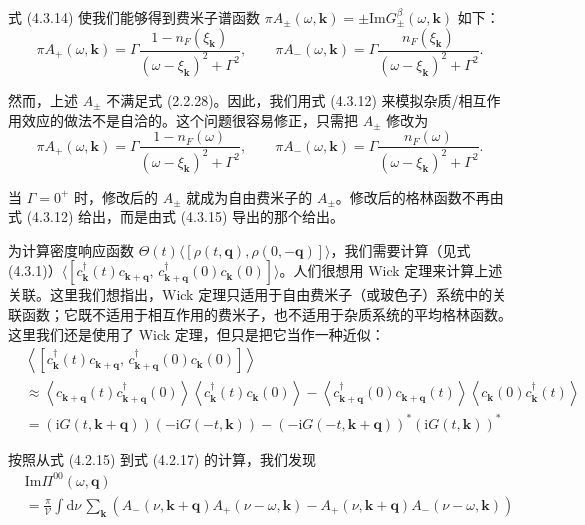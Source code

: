 式 (4.3.14) 使我们能够得到费米子谱函数 $\pi A_{\pm}(\omega,\pmb{k})=\pm\mathrm{Im}G^{\beta}_{\pm}(\omega,\pmb{k})$ 如下：
\begin{equation*}
\pi A_+(\omega,\pmb{k}) = \Gamma\frac{1-n_F(\xi_{\pmb{k}})}{(\omega-\xi_{\pmb{k}})^2+\Gamma^2}, \qquad \pi A_-(\omega,\pmb{k}) = \Gamma\frac{n_F(\xi_{\pmb{k}})}{(\omega-\xi_{\pmb{k}})^2+\Gamma^2}.
\end{equation*}

然而，上述 $A_{\pm}$ 不满足式 (2.2.28)。因此，我们用式 (4.3.12) 来模拟杂质/相互作用效应的做法不是自洽的。这个问题很容易修正，只需把 $A_{\pm}$ 修改为
\begin{equation*}
\pi A_+(\omega,\pmb{k}) = \Gamma\frac{1-n_F(\omega)}{(\omega-\xi_{\pmb{k}})^2+\Gamma^2}, \qquad \pi A_-(\omega,\pmb{k}) = \Gamma\frac{n_F(\omega)}{(\omega-\xi_{\pmb{k}})^2+\Gamma^2}. \tag{4.3.15}
\end{equation*}

当 $\Gamma=0^{+}$ 时，修改后的 $A_{\pm}$ 就成为自由费米子的 $A_{\pm}$。修改后的格林函数不再由式 (4.3.12) 给出，而是由式 (4.3.15) 导出的那个给出。

为计算密度响应函数 $\Theta(t)\langle[\rho(t,\pmb{q}),\allowbreak\rho(0,-\pmb{q})]\rangle$，我们需要计算（见式 (4.3.1)）$\langle[c^{\dagger}_{\pmb{k}}(t)c_{\pmb{k}+\pmb{q}},\allowbreak\, c^{\dagger}_{\pmb{k}+\pmb{q}}(0)c_{\pmb{k}}(0)]\rangle$。人们很想用 Wick 定理来计算上述关联。这里我们想指出，Wick 定理只适用于自由费米子（或玻色子）系统中的关联函数；它既不适用于相互作用的费米子，也不适用于杂质系统的平均格林函数。这里我们还是使用了 Wick 定理，但只是把它当作一种近似：
\begin{align*}
&\left\langle \left[c^{\dagger}_{\pmb{k}}(t)c_{\pmb{k}+\pmb{q}},\, c^{\dagger}_{\pmb{k}+\pmb{q}}(0)c_{\pmb{k}}(0)\right] \right\rangle\\
&\approx \left\langle c_{\pmb{k}+\pmb{q}}(t)c^{\dagger}_{\pmb{k}+\pmb{q}}(0) \right\rangle \left\langle c^{\dagger}_{\pmb{k}}(t)c_{\pmb{k}}(0) \right\rangle - \left\langle c^{\dagger}_{\pmb{k}+\pmb{q}}(0)c_{\pmb{k}+\pmb{q}}(t) \right\rangle \left\langle c_{\pmb{k}}(0)c^{\dagger}_{\pmb{k}}(t) \right\rangle\\
&= \left(\mathrm{i}G(t,\pmb{k}+\pmb{q})\right)\left(-\mathrm{i}G(-t,\pmb{k})\right) - \left(-\mathrm{i}G(-t,\pmb{k}+\pmb{q})\right)^{*}\left(\mathrm{i}G(t,\pmb{k})\right)^{*}
\end{align*}

按照从式 (4.2.15) 到式 (4.2.17) 的计算，我们发现
\begin{align*}
&\mathrm{Im}\Pi^{00}(\omega,\pmb{q}) \tag{4.3.16}\\
&= \frac{\pi}{\mathcal{V}}\int \mathrm{d}\nu\, \sum_{\pmb{k}}\left(A_-(\nu,\pmb{k}+\pmb{q})A_+(\nu-\omega,\pmb{k}) - A_+(\nu,\pmb{k}+\pmb{q})A_-(\nu-\omega,\pmb{k})\right)
\end{align*}

